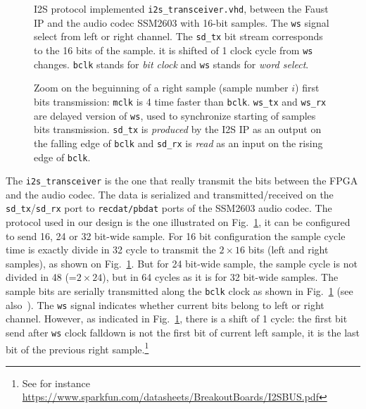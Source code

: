 \documentclass[11pt]{article}
\numberwithin{equation}{section}
\numberwithin{figure}{section}
\begin{document}


\begin{figure}[ht]
  
  \caption{I2S  protocol implemented {\tt i2s\_transceiver.vhd}, between the Faust IP and  the audio codec SSM2603 with 16-bit samples. The {\tt ws} signal select from left or right channel. The {\tt  sd\_tx} bit stream corresponds to the 16 bits of the sample. it is shifted of 1 clock cycle from {\tt ws} changes. {\tt bclk} stands for {\em bit clock} and {\tt ws} stands for {\em word select}.}
  \label{figi2s}
\end{figure}

\begin{figure}[ht]
  
  \caption{Zoom on the beguinning of a right sample  (sample number $i$) first bits transmission: {\tt mclk} is 4 time faster than {\tt bclk}. {\tt ws\_tx} and {\tt ws\_rx} are delayed version of {\tt ws}, used to synchronize starting of  samples bits transmission. {\tt sd\_tx} is {\em produced} by the I2S IP as an output on the falling edge of {\tt bclk} and {\tt sd\_rx} is {\em read} as an input on the rising edge of {\tt bclk}.}
  \label{figi2szoom1}
\end{figure}

The {\tt i2s\_transceiver} is the one that really transmit the bits between the FPGA and the audio codec. The data is serialized and transmitted/received on the {\tt sd\_tx}/{\tt sd\_rx} port to {\tt recdat/pbdat} ports of the SSM2603 audio codec. The protocol used in our design is the one illustrated on Fig.~\ref{figi2s}, it can be configured to send 16, 24 or 32 bit-wide sample. For 16 bit configuration the sample cycle time is exactly divide in 32 cycle to transmit the $2\times16$ bits (left and right samples), as shown on Fig.~\ref{figi2s}. But for 24 bit-wide sample, the sample cycle is not divided in 48 (=$2\times24$), but in 64 cycles as it is for 32  bit-wide samples.  The sample bits are serially transmitted along the {\tt bclk} clock as shown in Fig.~\ref{figi2s} (see also~\cite{ssm2603}). The {\tt ws} signal indicates whether current bits belong to  left or right channel. However, as indicated in Fig.~\ref{figi2s}, there is a shift of 1 cycle: the first bit send after {\tt ws} clock falldown is not the first bit of current left sample, it is the last bit of the previous right sample.\footnote{See for instance \url{https://www.sparkfun.com/datasheets/BreakoutBoards/I2SBUS.pdf}}
\end{document}
